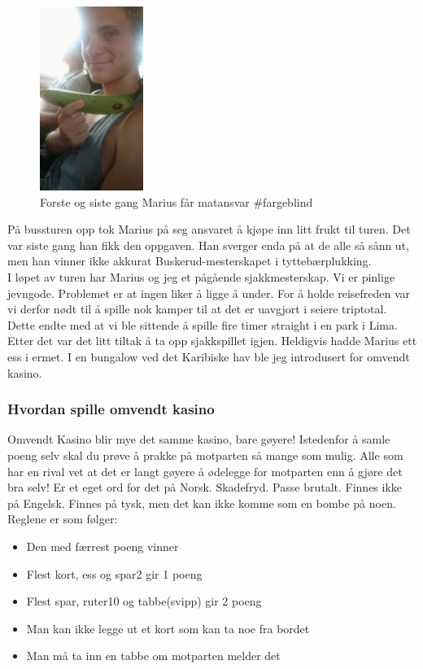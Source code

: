 \begin{figure}
	\begin{center}
		\includegraphics[width=0.30\textwidth]{Kjopmatmarius}
	\end{center}
	\caption*{Forste og siste gang Marius får matansvar
	\#fargeblind}
\end{figure}
På bussturen opp tok Marius på seg ansvaret å kjøpe
inn litt frukt til turen. Det var siste gang han fikk den oppgaven.
Han sverger enda på at de alle så sånn ut, men han vinner ikke
akkurat  Buskerud-mesterskapet i tyttebærplukking.\\

I løpet av turen har Marius og jeg et pågående sjakkmesterskap. Vi er
pinlige jevngode. Problemet er at ingen liker å ligge å under.
For å holde reisefreden var vi derfor nødt til å spille nok kamper til
at det er uavgjort i seiere triptotal. Dette endte med at vi ble
sittende å spille fire timer straight i en park i Lima. Etter det var
det litt tiltak å ta opp sjakkspillet igjen. Heldigvis hadde Marius
ett ess i ermet. I en bungalow ved det Karibiske hav ble jeg
introdusert for omvendt kasino.


\subsubsection{Hvordan spille omvendt kasino}
Omvendt Kasino blir mye det samme kasino, bare gøyere! Istedenfor
å samle poeng selv skal du prøve å prakke på motparten så mange som
mulig. Alle som har en rival vet at det er langt gøyere å ødelegge for
motparten enn å gjøre det bra selv! Er et eget ord for det på Norsk.
Skadefryd. Passe brutalt. Finnes ikke på Engelsk. Finnes på tysk, men
det kan ikke komme som en bombe på noen. Reglene er som følger:

\begin{itemize}
	\item Den med færrest poeng vinner
	\item Flest kort, ess  og spar2  gir 1 poeng
	\item Flest spar, ruter10 og tabbe(svipp) gir 2 poeng
	\item Man kan ikke legge ut et kort som kan ta noe fra bordet
	\item Man må ta inn en tabbe om motparten melder det
\end{itemize}

